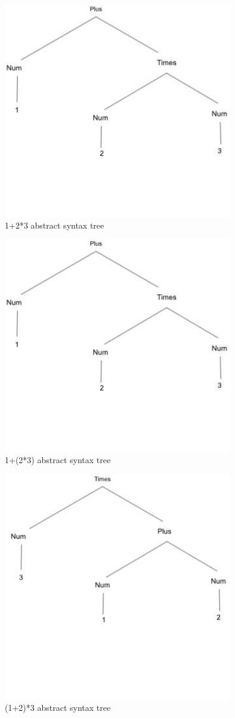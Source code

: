 \documentclass{article}
\theoremstyle{theorem}
\theoremstyle{definition}
\theoremstyle{remark}
\begin{document}
 \begin{figure}[htp]
    \centering
    \includegraphics[width=10cm]{2nd}
    \caption{1+2*3 abstract syntax tree}
    \label{fig:1+2*3}
\end{figure}
 \begin{figure}[htp]
    \centering
    \includegraphics[width=10cm]{2nd}
    \caption{1+(2*3)  abstract syntax tree}
    \label{fig:1+(2*3)}
\end{figure}
 \begin{figure}[htp]
    \centering
    \includegraphics[width=10cm]{4th (2)}
    \caption{(1+2)*3  abstract syntax tree}
    \label{fig:(1+2)*3}
\end{figure}
\end{document}
